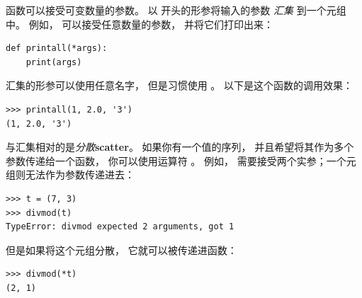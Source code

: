 {%

函数可以接受可变数量的参数。  以 {\bf *} 开头的形参将输入的参数 \emph{汇集} 到一个元组中。
例如，  可以接受任意数量的参数， 并将它们打印出来：

\begin{lstlisting}
def printall(*args):
    print(args)
\end{lstlisting}

%

汇集的形参可以使用任意名字， 但是习惯使用 。
以下是这个函数的调用效果：

\begin{lstlisting}
>>> printall(1, 2.0, '3')
(1, 2.0, '3')
\end{lstlisting}

%

与汇集相对的是\emph{分散}{\bf scatter}。
如果你有一个值的序列， 并且希望将其作为多个参数传递给一个函数，
你可以使用运算符 \li{*}。
例如，  需要接受两个实参；一个元组则无法作为参数传递进去：

  

\begin{lstlisting}
>>> t = (7, 3)
>>> divmod(t)
TypeError: divmod expected 2 arguments, got 1
\end{lstlisting}

%

但是如果将这个元组分散， 它就可以被传递进函数：

\begin{lstlisting}
>>> divmod(*t)
(2, 1)
\end{lstlisting}

%

}
